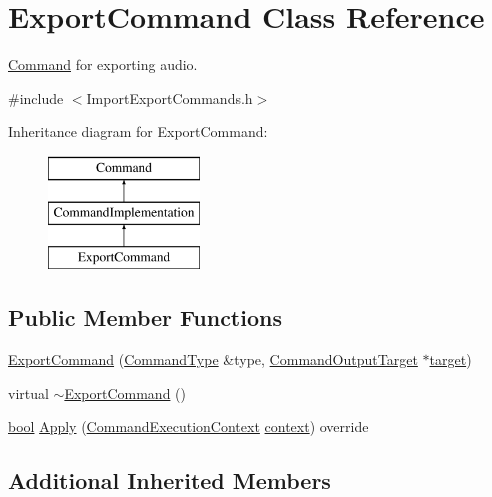 \hypertarget{class_export_command}{}\section{Export\+Command Class Reference}
\label{class_export_command}


\hyperlink{class_command}{Command} for exporting audio.  




{\ttfamily \#include $<$Import\+Export\+Commands.\+h$>$}

Inheritance diagram for Export\+Command\+:\begin{figure}[H]
\begin{center}
\leavevmode
\includegraphics[height=3.000000cm]{class_export_command}
\end{center}
\end{figure}
\subsection*{Public Member Functions}
\begin{DoxyCompactItemize}
\item 
\hyperlink{class_export_command_adb2eff48000de47334908fbe1d6256f7}{Export\+Command} (\hyperlink{class_command_type}{Command\+Type} \&type, \hyperlink{class_command_output_target}{Command\+Output\+Target} $\ast$\hyperlink{lib_2expat_8h_a15a257516a87decb971420e718853137}{target})
\item 
virtual \hyperlink{class_export_command_a9ebc58e9bd3b7826eff288888d972546}{$\sim$\+Export\+Command} ()
\item 
\hyperlink{mac_2config_2i386_2lib-src_2libsoxr_2soxr-config_8h_abb452686968e48b67397da5f97445f5b}{bool} \hyperlink{class_export_command_afa134eb0353771851333cbd7328766cd}{Apply} (\hyperlink{class_command_execution_context}{Command\+Execution\+Context} \hyperlink{structcontext}{context}) override
\end{DoxyCompactItemize}
\subsection*{Additional Inherited Members}


